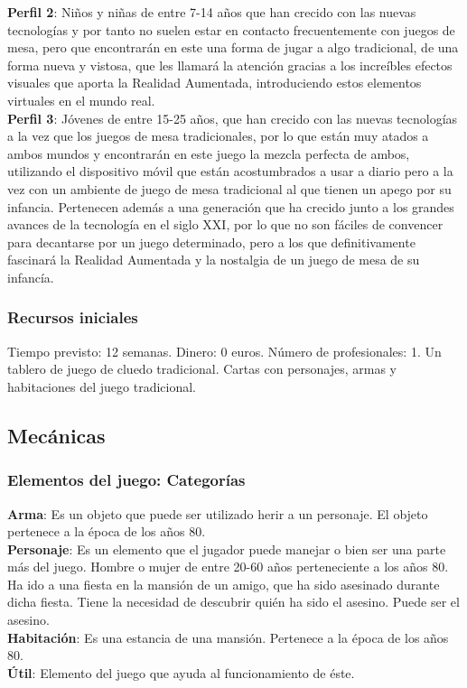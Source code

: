 \textbf{Perfil 2}: Niños y niñas de entre 7-14 años que han crecido con las nuevas tecnologías y por tanto no suelen estar en contacto frecuentemente con juegos de mesa, pero que encontrarán en este una forma de jugar a algo tradicional, de una forma nueva y vistosa, que les llamará la atención gracias a los increíbles efectos visuales que aporta la Realidad Aumentada, introduciendo estos elementos virtuales en el mundo real.\\

\textbf{Perfil 3}: Jóvenes de entre 15-25 años, que han crecido con las nuevas tecnologías a la vez que los juegos de mesa tradicionales, por lo que están muy atados a ambos mundos y encontrarán en este juego la mezcla perfecta de ambos, utilizando el dispositivo móvil que están acostumbrados a usar a diario pero a la vez con un ambiente de juego de mesa tradicional al que tienen un apego por su infancia. Pertenecen además a una generación que ha crecido junto a los grandes avances de la tecnología en el siglo XXI, por lo que no son fáciles de convencer para decantarse por un juego determinado, pero a los que definitivamente fascinará la Realidad Aumentada y la nostalgia de un juego de mesa de su infancía.

\subsubsection{Recursos iniciales}
Tiempo previsto: 12 semanas.
Dinero: 0 euros.
Número de profesionales: 1.
Un tablero de juego de cluedo tradicional.
Cartas con personajes, armas y habitaciones del juego tradicional.

\subsection{Mecánicas}
\subsubsection{Elementos del juego: Categorías}
\textbf{Arma}: Es un objeto que puede ser utilizado herir a un personaje. El objeto pertenece a la época de los años 80.\\
\textbf{Personaje}: Es un elemento que el jugador puede manejar o bien ser una parte más del juego. Hombre o mujer de entre 20-60 años perteneciente a los años 80. Ha ido a una fiesta en la mansión de un amigo, que ha sido asesinado durante dicha fiesta. Tiene la necesidad de descubrir quién ha sido el asesino. Puede ser el asesino.\\
\textbf{Habitación}: Es una estancia de una mansión. Pertenece a la época de los años 80.\\
\textbf{Útil}: Elemento del juego que ayuda al funcionamiento de éste.

